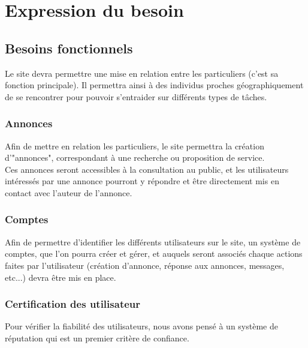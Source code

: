 \documentclass[a4paper,11pt]{article}
\begin{document}
\newpage
\section{Expression du besoin}

\subsection{Besoins fonctionnels}

Le site devra permettre une mise en relation entre les particuliers (c’est sa fonction principale). Il
permettra ainsi à des individus proches géographiquement de se rencontrer pour pouvoir s’entraider
sur différents types de tâches.\\


\subsubsection{Annonces}

Afin de mettre en relation les particuliers, le site permettra la création d'"annonces", correspondant à une recherche ou proposition de service.\\

Ces annonces seront accessibles à la consultation au public, et les utilisateurs intéressés par une annonce pourront y répondre et être directement mis en contact avec l'auteur de l'annonce.

\subsubsection{Comptes }

Afin de permettre d'identifier les différents utilisateurs sur le site, un système de comptes, que l'on pourra créer et gérer, et auquels seront associés chaque actions faites par l'utilisateur (création d'annonce, réponse aux annonces, messages, etc...) devra être mis en place.

\subsubsection{Certification des utilisateur}

Pour vérifier la fiabilité des utilisateurs,
nous avons pensé à un système de réputation qui est un premier critère de confiance.\\
\end{document}

